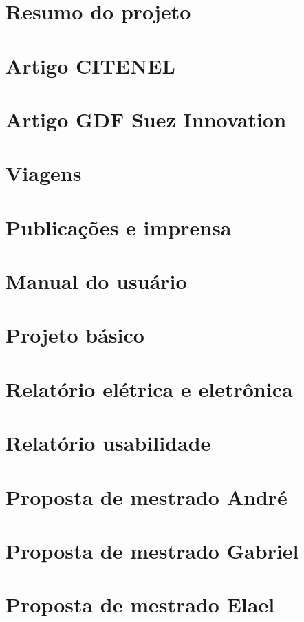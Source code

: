 \documentclass[a4paper,11pt,oneside,brazilian,
draft=false]{article}%
\begin{document}
 







\section{Resumo do projeto}

\section{Artigo CITENEL}

\section{Artigo GDF Suez Innovation}

\section{Viagens}

\section{Publicações e imprensa}

\section{Manual do usuário}

\section{Projeto básico}

\section{Relatório elétrica e eletrônica}

\section{Relatório usabilidade}

\section{Proposta de mestrado André}

\section{Proposta de mestrado Gabriel}

\section{Proposta de mestrado Elael} 
\end{document}
